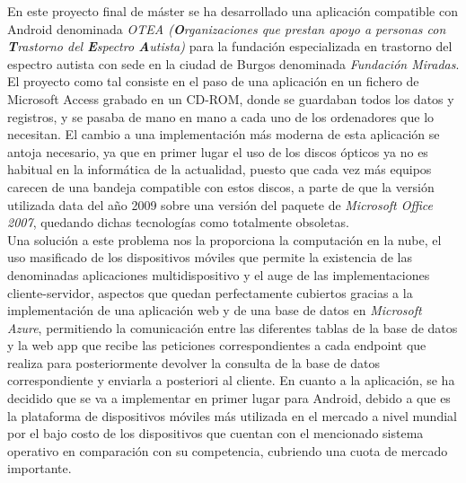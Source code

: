 
 
En este proyecto final de máster se ha desarrollado una aplicación compatible con
Android denominada \textit{OTEA (\textbf{O}rganizaciones que prestan apoyo a
personas con \textbf{T}rastorno del \textbf{E}spectro \textbf{A}utista)} para la
fundación especializada en trastorno del espectro autista con sede en la ciudad
de Burgos denominada \textit{Fundación Miradas}.\\
El proyecto como tal consiste en el paso de una aplicación en un fichero de
Microsoft Access grabado en un CD-ROM, donde se guardaban todos los datos y
registros, y se pasaba de mano en mano a cada uno de los ordenadores que lo
necesitan.
El cambio a una implementación más moderna de esta aplicación se antoja
necesario, ya que en primer lugar el uso de los discos ópticos ya no es habitual
en la informática de la actualidad, puesto que cada vez más equipos carecen de
una bandeja compatible con estos discos, a parte de que la versión utilizada
data del año 2009 sobre una versión del paquete de \textit{Microsoft Office
2007}, quedando dichas tecnologías como totalmente obsoletas. \\
Una solución a este problema nos la proporciona la computación en la nube, el
uso masificado de los dispositivos móviles que permite la existencia de las
denominadas aplicaciones multidispositivo y el auge de las implementaciones
cliente-servidor, aspectos que quedan perfectamente cubiertos gracias a la
implementación de una aplicación web y de una base de datos en \textit{Microsoft
Azure}, permitiendo la comunicación entre las diferentes tablas de la base de
datos y la web app que recibe las peticiones correspondientes a cada endpoint
que realiza para posteriormente devolver la consulta de la base de datos
correspondiente y enviarla a posteriori al cliente. En cuanto a la aplicación,
se ha decidido que se va a implementar en primer lugar para Android, debido a
que es la plataforma de dispositivos móviles más utilizada en el mercado a nivel
mundial por el bajo costo de los dispositivos que cuentan con el mencionado
sistema operativo en comparación con su competencia, cubriendo una cuota de
mercado importante.
\\
